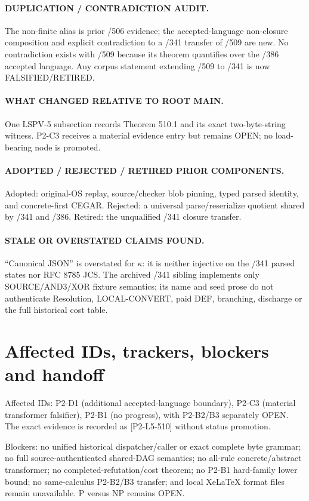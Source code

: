 \documentclass[11pt]{article}
\begin{document}
\paragraph{DUPLICATION / CONTRADICTION AUDIT.}
The non-finite alias is prior /506 evidence; the accepted-language
non-closure composition and explicit contradiction to a /341 transfer of /509
are new.  No contradiction exists with /509 because its theorem quantifies over
the /386 accepted language.  Any corpus statement extending /509 to /341 is
now FALSIFIED/RETIRED.

\paragraph{WHAT CHANGED RELATIVE TO ROOT MAIN.}
One LSPV-5 subsection records Theorem 510.1 and its exact two-byte-string
witness.  P2-C3 receives a material evidence entry but remains OPEN; no
load-bearing node is promoted.

\paragraph{ADOPTED / REJECTED / RETIRED PRIOR COMPONENTS.}
Adopted: original-OS replay, source/checker blob pinning, typed parsed identity,
and concrete-first CEGAR.  Rejected: a universal parse/reserialize quotient
shared by /341 and /386.  Retired: the unqualified /341 closure transfer.

\paragraph{STALE OR OVERSTATED CLAIMS FOUND.}
``Canonical JSON'' is overstated for $\kappa$: it is neither injective on the
/341 parsed states nor RFC 8785 JCS.  The archived /341 sibling implements only
SOURCE/AND3/XOR fixture semantics; its name and seed prose do not authenticate
Resolution, LOCAL-CONVERT, paid DEF, branching, discharge or the full historical
cost table.

\section{Affected IDs, trackers, blockers and handoff}
Affected IDs: P2-D1 (additional accepted-language boundary), P2-C3 (material
transformer falsifier), P2-B1 (no progress), with P2-B2/B3 separately OPEN.
The exact evidence is recorded as [P2-L5-510] without status promotion.

Blockers: no unified historical dispatcher/caller or exact complete byte
grammar; no full source-authenticated shared-DAG semantics; no all-rule
concrete/abstract transformer; no completed-refutation/cost theorem; no P2-B1
hard-family lower bound; no same-calculus P2-B2/B3 transfer; and local XeLaTeX
format files remain unavailable.  P versus NP remains OPEN.
\end{document}

